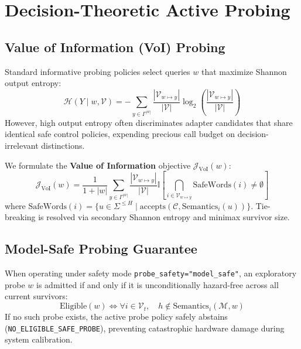 \documentclass[10pt,twocolumn,letterpaper]{article}
\begin{document}
\section{Decision-Theoretic Active Probing}
\label{sec:probing}

\subsection{Value of Information (VoI) Probing}
Standard informative probing policies select queries $w$ that maximize Shannon output entropy:
\begin{equation}
    \mathcal{H}(Y \mid w, \mathcal{V}) = -\sum_{y \in \Gamma^{|w|}} \frac{|\mathcal{V}_{w \mapsto y}|}{|\mathcal{V}|} \log_2 \left( \frac{|\mathcal{V}_{w \mapsto y}|}{|\mathcal{V}|} \right)
\end{equation}
However, high output entropy often discriminates adapter candidates that share identical safe control policies, expending precious call budget on decision-irrelevant distinctions.

We formulate the \textbf{Value of Information} objective $\mathcal{J}_{\text{VoI}}(w)$:
\begin{equation}
    \mathcal{J}_{\text{VoI}}(w) = \frac{1}{1 + |w|} \sum_{y \in \Gamma^{|w|}} \frac{|\mathcal{V}_{w \mapsto y}|}{|\mathcal{V}|} \mathbb{I}\left[ \bigcap_{i \in \mathcal{V}_{w \mapsto y}} \text{SafeWords}(i) \ne \emptyset \right]
\end{equation}
where $\text{SafeWords}(i) = \{ u \in \Sigma^{\le H} \mid \text{accepts}(\mathcal{C}, \text{Semantics}_i(u)) \}$.
Tie-breaking is resolved via secondary Shannon entropy and minimax survivor size.

\subsection{Model-Safe Probing Guarantee}
When operating under safety mode \texttt{probe\_safety="model\_safe"}, an exploratory probe $w$ is admitted if and only if it is unconditionally hazard-free across all current survivors:
\begin{equation}
    \text{Eligible}(w) \iff \forall i \in \mathcal{V}_t, \quad h \notin \text{Semantics}_i(\mathcal{M}, w)
\end{equation}
If no such probe exists, the active probe policy safely abstains (\texttt{NO\_ELIGIBLE\_SAFE\_PROBE}), preventing catastrophic hardware damage during system calibration.
\end{document}
